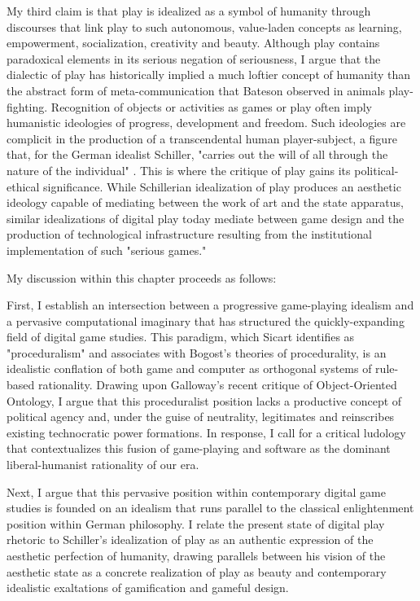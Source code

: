My third claim is that play is idealized as a symbol of humanity through discourses that link play to such autonomous, value-laden concepts as learning, empowerment, socialization, creativity and beauty. Although play contains paradoxical elements in its serious negation of seriousness, I argue that the dialectic of play has historically implied a much loftier concept of humanity than the abstract form of meta-communication that Bateson observed in animals play-fighting. Recognition of objects or activities as games or play often imply humanistic ideologies of progress, development and freedom. Such ideologies are complicit in the production of a transcendental human player-subject, a figure that, for the German idealist Schiller, "carries out the will of all through the nature of the individual" \autocite*[138]{Schiller2004-if}. This is where the critique of play gains its political-ethical significance. While Schillerian idealization of play produces an aesthetic ideology capable of mediating between the work of art and the state apparatus, similar idealizations of digital play today mediate between game design and the production of technological infrastructure resulting from the institutional implementation of such "serious games."

My discussion within this chapter proceeds as follows:

First, I establish an intersection between a progressive game-playing idealism and a pervasive computational imaginary that has structured the quickly-expanding field of digital game studies. This paradigm, which Sicart identifies as "proceduralism" and associates with Bogost's theories of procedurality, is an idealistic conflation of both game and computer as orthogonal systems of rule-based rationality. Drawing upon Galloway's recent critique of Object-Oriented Ontology, I argue that this proceduralist position lacks a productive concept of political agency and, under the guise of neutrality, legitimates and reinscribes existing technocratic power formations. In response, I call for a critical ludology that contextualizes this fusion of game-playing and software as the dominant liberal-humanist rationality of our era.

Next, I argue that this pervasive position within contemporary digital game studies is founded on an idealism that runs parallel to the classical enlightenment position within German philosophy. I relate the present state of digital play rhetoric to Schiller's idealization of play as an authentic expression of the aesthetic perfection of humanity, drawing parallels between his vision of the aesthetic state as a concrete realization of play as beauty and contemporary idealistic exaltations of gamification and gameful design.

